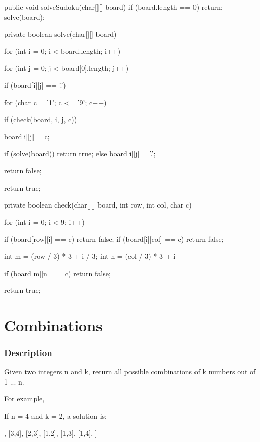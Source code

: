 \begin{Code}
public void solveSudoku(char[][] board) {
    if (board.length == 0) {
        return;
    }
    solve(board);
}

private boolean solve(char[][] board) {
    for (int i = 0; i < board.length; i++) {
        for (int j = 0; j < board[0].length; j++) {
            if (board[i][j] == '.') {
                for (char c = '1'; c <= '9'; c++) {
                    if (check(board, i, j, c)) {
                        board[i][j] = c;

                        if (solve(board)) {
                            return true;
                        } else {
                            board[i][j] = '.';
                        }
                    }
                }
                return false;
            }
        }
    }
    return true;
}
\end{Code}

\newpage

\begin{Code}
private boolean check(char[][] board, int row, int col, char c) {
    for (int i = 0; i < 9; i++) {
        if (board[row][i] == c) {
            return false;
        }
        if (board[i][col] == c) {
            return false;
        }

        int m = (row / 3) * 3 + i / 3;
        int n = (col / 3) * 3 + i %

        if (board[m][n] == c) {
            return false;
        }
    }
    return true;
}
\end{Code}

\newpage

\section{Combinations} %

\subsubsection{Description}

Given two integers n and k, return all possible combinations of k numbers out of 1 ... n.

For example,

If n = 4 and k = 2, a solution is:
\begin{Code}
[
  [2,4],
  [3,4],
  [2,3],
  [1,2],
  [1,3],
  [1,4],
]
\end{Code}

